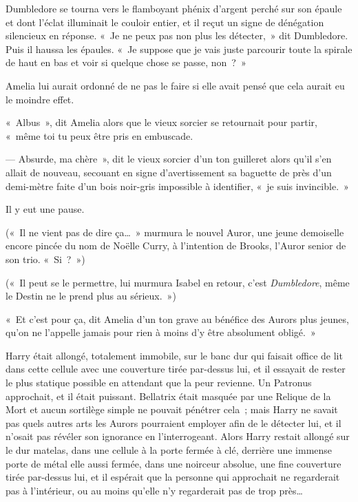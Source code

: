Dumbledore se tourna vers le flamboyant phénix d'argent perché sur son épaule et dont l'éclat illuminait le couloir entier, et il reçut un signe de dénégation silencieux en réponse.
«~Je ne peux pas non plus les détecter,~» dit Dumbledore.
Puis il haussa les épaules.
«~Je suppose que je vais juste parcourir toute la spirale de haut en bas et voir si quelque chose se passe, non~?~»

Amelia lui aurait ordonné de ne pas le faire si elle avait pensé que cela aurait eu le moindre effet.

«~Albus~», dit Amelia alors que le vieux sorcier se retournait pour partir, «~même toi tu peux être pris en embuscade.

--- Absurde, ma chère~», dit le vieux sorcier d'un ton guilleret alors qu'il s'en allait de nouveau, secouant en signe d'avertissement sa baguette de près d'un demi-mètre faite d'un bois noir-gris impossible à identifier, «~je suis invincible.~»

Il y eut une pause.

(«~Il ne vient pas de dire ça…~»
murmura le nouvel Auror, une jeune demoiselle encore pincée du nom de Noëlle Curry, à l'intention de Brooks, l'Auror senior de son trio.
«~Si~?~»)

(«~Il peut se le permettre, lui murmura Isabel en retour, c'est \emph{Dumbledore}, même le Destin ne le prend plus au sérieux.~»)

«~Et c'est pour ça, dit Amelia d'un ton grave au bénéfice des Aurors plus jeunes, qu'on ne l'appelle jamais pour rien à moins d'y être absolument obligé.~»

\later

Harry était allongé, totalement immobile, sur le banc dur qui faisait office de lit dans cette cellule avec une couverture tirée par-dessus lui, et il essayait de rester le plus statique possible en attendant que la peur revienne.
Un Patronus approchait, et il était puissant.
Bellatrix était masquée par une Relique de la Mort et aucun sortilège simple ne pouvait pénétrer cela~; mais Harry ne savait pas quels autres arts les Aurors pourraient employer afin de le détecter lui, et il n'osait pas révéler son ignorance en l'interrogeant.
Alors Harry restait allongé sur le dur matelas, dans une cellule à la porte fermée à clé, derrière une immense porte de métal elle aussi fermée, dans une noirceur absolue, une fine couverture tirée par-dessus lui, et il espérait que la personne qui approchait ne regarderait pas à l'intérieur, ou au moins qu'elle n'y regarderait pas de trop près…

